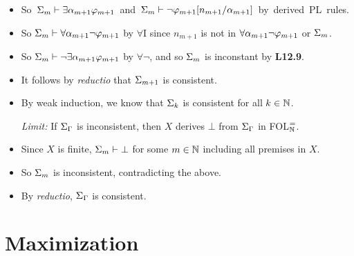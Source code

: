 \documentclass[a4paper, 11pt]{article} %
\begin{document}
\begin{itemize}
    \item \mbox{So $\Sigma_m\vdash \exists \alpha_{m+1}\varphi_{m+1}$ and $\Sigma_m\vdash\neg\varphi_{m+1}[n_{m+1}/\alpha_{m+1}]$ by derived PL rules.}
    \item So $\Sigma_m\vdash \forall \alpha_{m+1}\neg\varphi_{m+1}$ by $\forall$I since $n_{m+1}$ is not in $\forall \alpha_{m+1}\neg\varphi_{m+1}$ or $\Sigma_m$.
    \item So $\Sigma_m\vdash \neg\exists \alpha_{m+1}\varphi_{m+1}$ by $\forall\neg$, and so $\Sigma_m$ is inconstant by \textbf{L12.9}.
    \item It follows by \textit{reductio} that $\Sigma_{m+1}$ is consistent.
    \item By weak induction, we know that $\Sigma_k$ is consistent for all $k \in \mathbb{N}$.
    \item[\it Limit:] If $\Sigma_{\Gamma}$ is inconsistent, then $X$ derives $\bot$ from $\Sigma_{\Gamma}$ in FOL$^=_{\mathbb{N}}$. 
    \item Since $X$ is finite, $\Sigma_m\vdash\bot$ for some $m\in\mathbb{N}$ including all premises in $X$.
    \item So $\Sigma_m$ is inconsistent, contradicting the above. 
    \item By \textit{reductio}, $\Sigma_{\Gamma}$ is consistent. 
\end{itemize}






\section*{Maximization}
\end{document}

